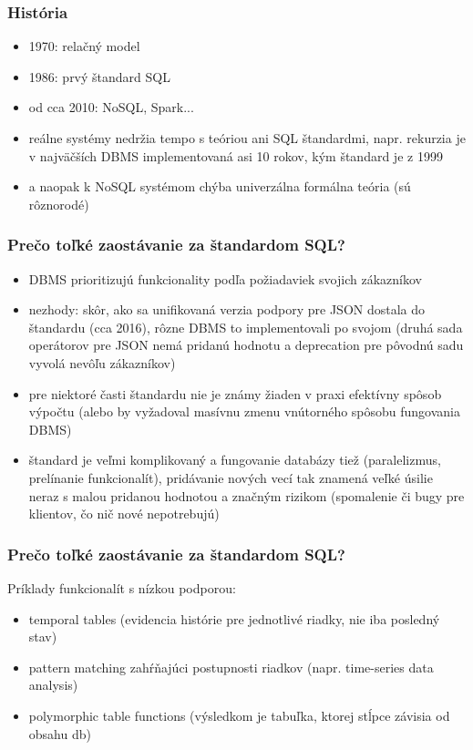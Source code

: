 \documentclass[12pt]{beamer}
\begin{document}
\begin{frame}
\frametitle{História}
\begin{itemize}
\item 1970: relačný model
\item 1986: prvý štandard SQL
\item od cca 2010: NoSQL, Spark...
\pause
\item reálne systémy nedržia tempo s teóriou ani SQL štandardmi,
    napr. rekurzia je v najväčších DBMS implementovaná asi 10 rokov, kým štandard je z 1999
\item a naopak k NoSQL systémom chýba univerzálna formálna teória (sú rôznorodé)
\end{itemize}
\end{frame}

\begin{frame}
\frametitle{Prečo toľké zaostávanie za štandardom SQL?}
\begin{itemize}
\item DBMS prioritizujú funkcionality podľa požiadaviek svojich zákazníkov
\item nezhody: skôr, ako sa unifikovaná verzia podpory pre JSON dostala do štandardu (cca 2016), rôzne DBMS to implementovali po svojom
(druhá sada operátorov pre JSON nemá pridanú hodnotu a deprecation pre pôvodnú sadu vyvolá nevôľu zákazníkov)
\item pre niektoré časti štandardu nie je známy žiaden v praxi efektívny spôsob výpočtu (alebo by vyžadoval masívnu zmenu vnútorného spôsobu fungovania DBMS)
\item štandard je veľmi komplikovaný a fungovanie databázy tiež (paralelizmus, prelínanie funkcionalít), pridávanie nových vecí tak znamená veľké úsilie neraz s malou pridanou hodnotou a značným rizikom (spomalenie či bugy pre klientov, čo nič nové nepotrebujú)
\end{itemize}
\end{frame}

\begin{frame}
\frametitle{Prečo toľké zaostávanie za štandardom SQL?}
Príklady funkcionalít s nízkou podporou:
\begin{itemize}
\item temporal tables (evidencia histórie pre jednotlivé riadky, nie iba posledný stav)
\item pattern matching zahŕňajúci postupnosti riadkov (napr. time-series data analysis)
\item polymorphic table functions (výsledkom je tabuľka, ktorej stĺpce závisia od obsahu db)
\end{itemize}
\end{frame}
\end{document}
